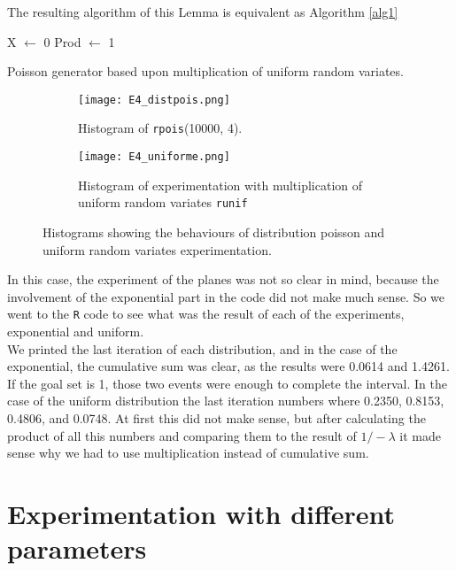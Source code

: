 \documentclass{article}
\begin{document}
The resulting algorithm of this Lemma is equivalent as Algorithm \ref{alg1}

\begin{algorithm}[]
X $\leftarrow$ 0\;
Prod $\leftarrow$ 1\;
 \caption{Poisson generator based upon multiplication of uniform random variates.}\label{alg2}
\end{algorithm}

\begin{figure}[]
\begin{subfigure}{.5\textwidth}
  \centering
  \texttt{[image: E4\_distpois.png]}  
  \caption{Histogram of \texttt{rpois}(10000, 4).}
  \label{subfig3-1}
\end{subfigure}
\begin{subfigure}{.5\textwidth}
  \centering
  \texttt{[image: E4\_uniforme.png]}  
  \caption{Histogram of experimentation with multiplication of uniform random variates \texttt{runif}}
  \label{subfig3-2}
\end{subfigure}
\caption{Histograms showing the behaviours of distribution poisson and uniform random variates experimentation.}
\label{fig3}
\end{figure}

\clearpage

In this case, the experiment of the planes was not so clear in mind, because the involvement of the exponential part in the code did not make much sense. So we went to the \texttt{R} code to see what was the result of each of the experiments, exponential and uniform. \\

We printed the last iteration of each distribution, and in the case of the exponential, the cumulative sum was clear, as the results were 0.0614 and 1.4261. If the goal set is 1, those two events were enough to complete the interval. In the case of the uniform distribution the last iteration numbers where 0.2350, 0.8153, 0.4806, and 0.0748. At first this did not make sense, but after calculating the product of all this numbers and comparing them to the result of $1/-\lambda$ it made sense why we had to use multiplication instead of cumulative sum. \\

\section{Experimentation with different parameters}
\end{document}
